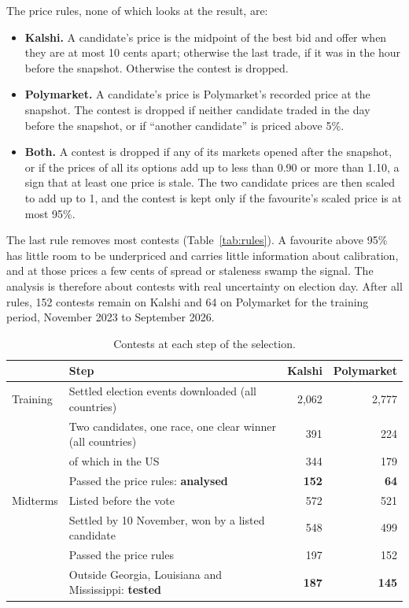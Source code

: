 The price rules, none of which looks at the result, are:
\begin{itemize}
  \item \textbf{Kalshi.} A candidate's price is the midpoint of the best bid and offer when they are at most 10 cents
        apart; otherwise the last trade, if it was in the hour before the snapshot. Otherwise the contest is dropped.
  \item \textbf{Polymarket.} A candidate's price is Polymarket's recorded price at the snapshot. The contest is dropped
        if neither candidate traded in the day before the snapshot, or if ``another candidate'' is priced above 5\%.
  \item \textbf{Both.} A contest is dropped if any of its markets opened after the snapshot, or if the prices of all its
        options add up to less than 0.90 or more than 1.10, a sign that at least one price is stale. The two candidate
        prices are then scaled to add up to 1, and the contest is kept only if the favourite's scaled price is at most
        95\%.
\end{itemize}
The last rule removes most contests (Table~\ref{tab:rules}). A favourite above 95\% has little room to be
underpriced and carries little information about calibration, and at those prices a few cents of spread or staleness
swamp the signal. The analysis is therefore about contests with real uncertainty on election day. After all rules,
152 contests remain on Kalshi and 64 on Polymarket for the training period, November 2023 to September 2026.

\begin{table}[t]
\centering\small
\caption{Contests at each step of the selection.}\label{tab:selection}
\begin{tabular}{llrr}
\toprule
 & Step & Kalshi & Polymarket \\
\midrule
Training & Settled election events downloaded (all countries) & 2{,}062 & 2{,}777 \\
 & Two candidates, one race, one clear winner (all countries) & 391 & 224 \\
 & \quad of which in the US & 344 & 179 \\
 & Passed the price rules: \textbf{analysed} & \textbf{152} & \textbf{64} \\
\midrule
Midterms & Listed before the vote & 572 & 521 \\
 & Settled by 10 November, won by a listed candidate & 548 & 499 \\
 & Passed the price rules & 197 & 152 \\
 & Outside Georgia, Louisiana and Mississippi: \textbf{tested} & \textbf{187} & \textbf{145} \\
\bottomrule
\end{tabular}
\end{table}

